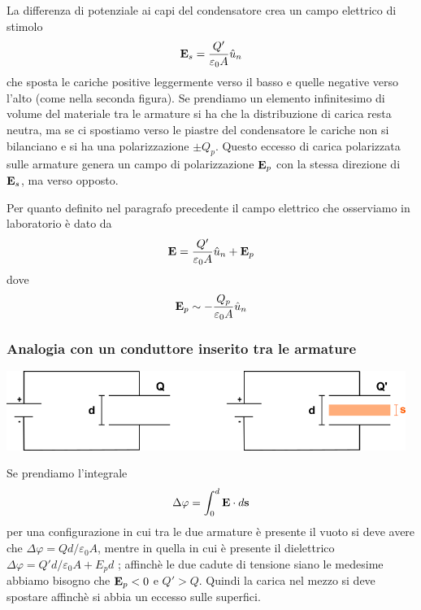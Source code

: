 La differenza di potenziale ai capi del condensatore crea un campo elettrico di stimolo 
\begin{equation*}
	\bold{E}_s = \frac{Q'}{\varepsilon_0 A}\hat{u}_n
\end{equation*}
che sposta le cariche positive leggermente verso il basso e quelle negative verso l'alto (come nella seconda figura). Se prendiamo un elemento infinitesimo di volume del materiale tra le armature si ha che la distribuzione di carica resta neutra, ma se ci spostiamo verso le piastre del condensatore le cariche non si bilanciano e si ha una polarizzazione $\pm Q_{p}$. Questo eccesso di carica polarizzata sulle armature genera un campo di polarizzazione $\bold{E}_{p}$ con la stessa direzione di $\bold{E}_s$, ma verso opposto.

Per quanto definito nel paragrafo precedente il campo elettrico che osserviamo in laboratorio \`e dato da 
\begin{equation*}
	\bold{E} = \frac{Q'}{\varepsilon_0 A}\hat{u}_n + \bold{E}_p
\end{equation*}
dove 
\begin{equation*}
	\bold{E}_{p} \sim - \frac{Q_p}{\varepsilon_0 A}\hat{u}_n
\end{equation*}

\subsubsection{Analogia con un conduttore inserito tra le armature}

\vspace{0.5cm}
\begin{center}
	\includegraphics[width = 13cm]{images/faraday_conduct}
\end{center}
Se prendiamo l'integrale 
\begin{equation*}
	\Delta \varphi = \int_0^d \bold{E} \cdot d\bold{s} 
\end{equation*}
per una configurazione in cui tra le due armature \`e presente il vuoto si deve avere che $\Delta \varphi = Qd/\varepsilon_0 A $, mentre in quella in cui \`e presente il dielettrico $\Delta \varphi = Q'd/\varepsilon_0 A + E_p d$ ; affinch\`e le due cadute di tensione siano le medesime abbiamo bisogno che $\bold{E}_p < 0$ e $Q' > Q$. Quindi la carica nel mezzo si deve spostare affinch\`e si abbia un eccesso sulle superfici. 
\newline


